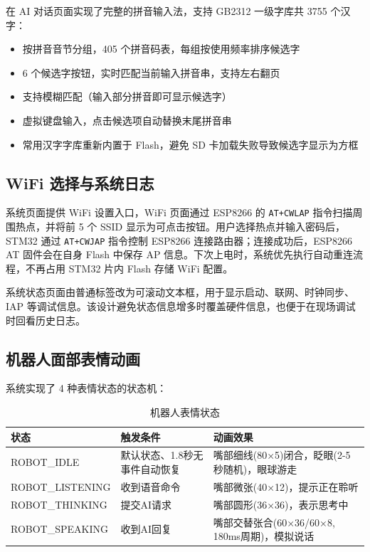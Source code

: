 \documentclass[12pt,a4paper]{ctexart}
\begin{document}
在 AI 对话页面实现了完整的拼音输入法，支持 GB2312 一级字库共 3755 个汉字：

\begin{itemize}
    \item 按拼音音节分组，405 个拼音码表，每组按使用频率排序候选字
    \item 6 个候选字按钮，实时匹配当前输入拼音串，支持左右翻页
    \item 支持模糊匹配（输入部分拼音即可显示候选字）
    \item 虚拟键盘输入，点击候选项自动替换末尾拼音串
    \item 常用汉字字库重新内置于 Flash，避免 SD 卡加载失败导致候选字显示为方框
\end{itemize}

\subsection{WiFi 选择与系统日志}

系统页面提供 WiFi 设置入口，WiFi 页面通过 ESP8266 的 \texttt{AT+CWLAP} 指令扫描周围热点，并将前 5 个 SSID 显示为可点击按钮。用户选择热点并输入密码后，STM32 通过 \texttt{AT+CWJAP} 指令控制 ESP8266 连接路由器；连接成功后，ESP8266 AT 固件会在自身 Flash 中保存 AP 信息。下次上电时，系统优先执行自动重连流程，不再占用 STM32 片内 Flash 存储 WiFi 配置。

系统状态页面由普通标签改为可滚动文本框，用于显示启动、联网、时钟同步、IAP 等调试信息。该设计避免状态信息增多时覆盖硬件信息，也便于在现场调试时回看历史日志。

\subsection{机器人面部表情动画}

系统实现了 4 种表情状态的状态机：

\begin{table}[H]
\centering
\begin{tabularx}{\textwidth}{llX}
\toprule
\textbf{状态} & \textbf{触发条件} & \textbf{动画效果} \\
\midrule
ROBOT\_IDLE & 默认状态、1.8秒无事件自动恢复 & 嘴部细线(80×5)闭合，眨眼(2-5秒随机)，眼球游走 \\
ROBOT\_LISTENING & 收到语音命令 & 嘴部微张(40×12)，提示正在聆听 \\
ROBOT\_THINKING & 提交AI请求 & 嘴部圆形(36×36)，表示思考中 \\
ROBOT\_SPEAKING & 收到AI回复 & 嘴部交替张合(60×36/60×8, 180ms周期)，模拟说话 \\
\bottomrule
\end{tabularx}
\caption{机器人表情状态}
\end{table}
\end{document}
